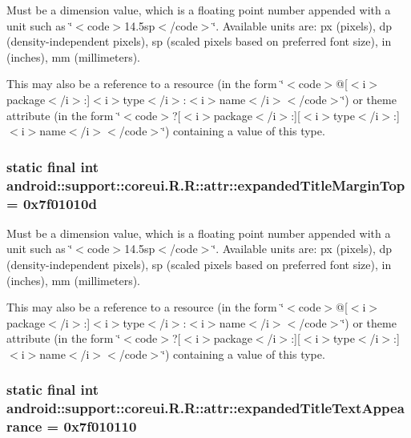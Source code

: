 Must be a dimension value, which is a floating point number appended with a unit such as \char`\"{}$<$code$>$14.5sp$<$/code$>$\char`\"{}. Available units are: px (pixels), dp (density-independent pixels), sp (scaled pixels based on preferred font size), in (inches), mm (millimeters). 

This may also be a reference to a resource (in the form \char`\"{}$<$code$>$@\mbox{[}$<$i$>$package$<$/i$>$:\mbox{]}$<$i$>$type$<$/i$>$:$<$i$>$name$<$/i$>$$<$/code$>$\char`\"{}) or theme attribute (in the form \char`\"{}$<$code$>$?\mbox{[}$<$i$>$package$<$/i$>$:\mbox{]}\mbox{[}$<$i$>$type$<$/i$>$:\mbox{]}$<$i$>$name$<$/i$>$$<$/code$>$\char`\"{}) containing a value of this type. \hypertarget{classandroid_1_1support_1_1coreui_1_1_r_1_1attr_3f1a5b52a8d4152ee454d04783962f7e}{
\subsubsection[{expandedTitleMarginTop}]{\setlength{\rightskip}{0pt plus 5cm}static final int android::support::coreui.R.R::attr::expandedTitleMarginTop = 0x7f01010d}}
\label{classandroid_1_1support_1_1coreui_1_1_r_1_1attr_3f1a5b52a8d4152ee454d04783962f7e}


Must be a dimension value, which is a floating point number appended with a unit such as \char`\"{}$<$code$>$14.5sp$<$/code$>$\char`\"{}. Available units are: px (pixels), dp (density-independent pixels), sp (scaled pixels based on preferred font size), in (inches), mm (millimeters). 

This may also be a reference to a resource (in the form \char`\"{}$<$code$>$@\mbox{[}$<$i$>$package$<$/i$>$:\mbox{]}$<$i$>$type$<$/i$>$:$<$i$>$name$<$/i$>$$<$/code$>$\char`\"{}) or theme attribute (in the form \char`\"{}$<$code$>$?\mbox{[}$<$i$>$package$<$/i$>$:\mbox{]}\mbox{[}$<$i$>$type$<$/i$>$:\mbox{]}$<$i$>$name$<$/i$>$$<$/code$>$\char`\"{}) containing a value of this type. \hypertarget{classandroid_1_1support_1_1coreui_1_1_r_1_1attr_ad8cd1ede718549212843cca7246512a}{
\subsubsection[{expandedTitleTextAppearance}]{\setlength{\rightskip}{0pt plus 5cm}static final int android::support::coreui.R.R::attr::expandedTitleTextAppearance = 0x7f010110}}
\label{classandroid_1_1support_1_1coreui_1_1_r_1_1attr_ad8cd1ede718549212843cca7246512a}


